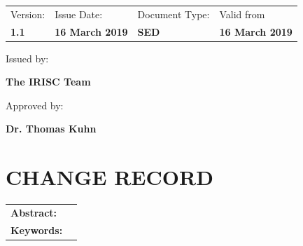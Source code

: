 \documentclass[a4paper,12pt,oneside]{article}
\begin{document}
\begin{flushleft}
\begin{tabular}{p{} p{} p{} p{}}
\footnotesize{Version:}     & \footnotesize{Issue Date:} & \footnotesize{Document Type:} & \footnotesize{Valid from} \\
\textbf{1.1}          & \textbf{16 March 2019}    & \textbf{SED}   & \textbf{16 March 2019}
\end{tabular}

\vspace{10pt}

\small
{
Issued by:\\
}

\vspace{0.3cm}

\large
{
\textbf{The IRISC Team} \\
}

\vspace{0.3cm}

\small
{
Approved by:\\
}

\vspace{0.3cm}

\large
{
\textbf{Dr. Thomas Kuhn}
}
\end{flushleft}




\pagestyle{firstp}
\section*{\small{\textbf{CHANGE RECORD}}}
%


\newpage

\vspace{1cm}
\begin{tabular}{p{} p{}}
\textbf{Abstract:}     &  \\ %
\textbf{Keywords:}     & %

\end{tabular}

\vfill


\end{document}
